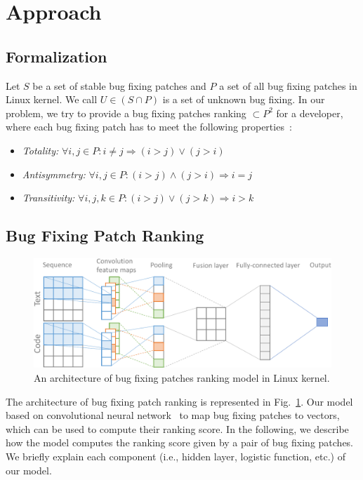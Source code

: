 \section{Approach}
\label{sec:approach}
\subsection{Formalization}
\label{sec:formalization}

Let $S$ be a set of stable bug fixing patches and $P$ a set of all bug fixing patches in Linux kernel. We call $U \in (S \cap P ) $ is a set of unknown bug fixing. In our problem, we try to provide a bug fixing patches ranking $\subset P^2$ for a developer, where each bug fixing patch has to meet the following properties~\cite{rendle2009bpr}:
\begin{itemize}
	\item \textit{Totality:} $\forall i,j \in P: i \neq j \Rightarrow (i > j) \vee (j > i)$
	\item \textit{Antisymmetry:} $\forall i,j \in P: (i > j) \wedge (j > i) \Rightarrow i = j$ 
	\item \textit{Transitivity:} $\forall i,j,k \in P: (i > j) \vee (j > k) \Rightarrow i > k$ 
\end{itemize}

\subsection{Bug Fixing Patch Ranking}
\label{sec:bugranking}
\begin{figure}[t!]
	\centering
	\includegraphics[width=1.0\textwidth]{BugPatchingRanking_v4-cropped.pdf}
	\caption{An architecture of bug fixing patches ranking model in Linux kernel.}
	\label{fig:bugranking}
\end{figure}

The architecture of bug fixing patch ranking is represented in Fig.~\ref{fig:bugranking}. Our model based on convolutional neural network~\cite{lecun1995convolutional} to map bug fixing patches to vectors, which can be used to compute their ranking score. In the following, we describe how the model computes the ranking score given by a pair of bug fixing patches. We briefly explain each component (i.e., hidden layer, logistic function, etc.) of our model.

